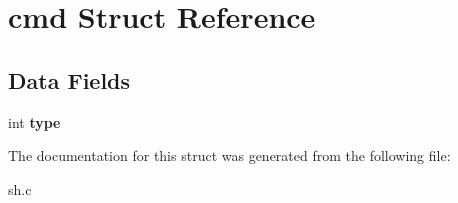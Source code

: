 \hypertarget{structcmd}{}\section{cmd Struct Reference}
\label{structcmd}
\subsection*{Data Fields}
\begin{DoxyCompactItemize}
\item 
\mbox{\label{structcmd_a9b861866e1dec63e694247fb4d976423}} 
int {\bfseries type}
\end{DoxyCompactItemize}


The documentation for this struct was generated from the following file\+:\begin{DoxyCompactItemize}
\item 
sh.\+c\end{DoxyCompactItemize}
